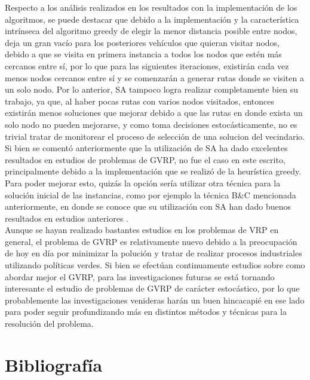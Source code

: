 \documentclass[letter, 10pt]{article}
\begin{document}
Respecto a los análisis realizados en los resultados con la implementación de los algoritmos, se puede destacar que debido a la implementación y la característica intrínseca del algoritmo greedy de elegir la menor distancia posible entre nodos, deja un gran vacío para los posteriores vehículos que quieran visitar nodos, debido a que se visita en primera instancia a todos los nodos que estén más cercanos entre sí, por lo que para las siguientes iteraciones, existirán cada vez menos nodos cercanos entre sí y se comenzarán a generar rutas donde se visiten a un solo nodo. Por lo anterior, SA tampoco logra realizar completamente bien su trabajo, ya que, al haber pocas rutas con varios nodos visitados, entonces existirán menos soluciones que mejorar debido a que las rutas en donde exista un solo nodo no pueden mejorarse, y como toma decisiones estocásticamente, no es trivial tratar de monitorear el proceso de selección de una solucion del vecindario. Si bien se comentó anteriormente que la utilización de SA ha dado excelentes resultados en estudios de problemas de GVRP, no fue el caso en este escrito, principalmente debido a la implementación que se realizó de la heurística greedy. Para poder mejorar esto, quizás la opción sería utilizar otra técnica para la solución inicial de las instancias, como por ejemplo la técnica B\&C mencionada anteriormente, en donde se conoce que su utilización con SA han dado buenos resultados en estudios anteriores \cite{BYCSA}.
\\

Aunque se hayan realizado bastantes estudios en los problemas de VRP en general, el problema de GVRP es relativamente nuevo debido a la preocupación de hoy en día por minimizar la polución y tratar de realizar procesos industriales utilizando políticas verdes. Si bien se efectúan continuamente estudios sobre como abordar mejor el GVRP, para las investigaciones futuras se está tornando interesante el estudio de problemas de GVRP de carácter estocástico, por lo que probablemente las investigaciones venideras harán un buen hincacapié en ese lado para poder seguir profundizando más en distintos métodos y técnicas para la resolución del problema.


\section{Bibliograf\'ia}


\end{document}
